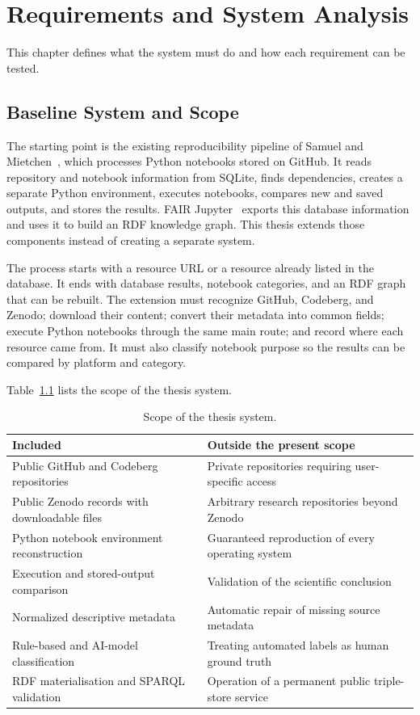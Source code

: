 \chapter{Requirements and System Analysis}
\label{chap:requirements}

This chapter defines what the system must do and how each requirement can be tested.

\section{Baseline System and Scope}

The starting point is the existing reproducibility pipeline of Samuel and Mietchen~\cite{samuel2024computational}, which processes Python notebooks stored on GitHub. It reads repository and notebook information from SQLite, finds dependencies, creates a separate Python environment, executes notebooks, compares new and saved outputs, and stores the results. FAIR Jupyter~\cite{samuel2024fairjupyter} exports this database information and uses it to build an RDF knowledge graph. This thesis extends those components instead of creating a separate system.

The process starts with a resource URL or a resource already listed in the database. It ends with database results, notebook categories, and an RDF graph that can be rebuilt. The extension must recognize GitHub, Codeberg, and Zenodo; download their content; convert their metadata into common fields; execute Python notebooks through the same main route; and record where each resource came from. It must also classify notebook purpose so the results can be compared by platform and category.

Table~\ref{tab:scope} lists the scope of the thesis system.

\begin{table}[H]
\centering
\caption{Scope of the thesis system.}
\label{tab:scope}
\footnotesize
\begin{tabularx}{\textwidth}{@{}XX@{}}
\toprule
Included & Outside the present scope\tabularnewline
\midrule
Public GitHub and Codeberg repositories & Private repositories requiring user-specific access\tabularnewline
Public Zenodo records with downloadable files & Arbitrary research repositories beyond Zenodo\tabularnewline
Python notebook environment reconstruction & Guaranteed reproduction of every operating system\tabularnewline
Execution and stored-output comparison & Validation of the scientific conclusion\tabularnewline
Normalized descriptive metadata & Automatic repair of missing source metadata\tabularnewline
Rule-based and AI-model classification & Treating automated labels as human ground truth\tabularnewline
RDF materialisation and SPARQL validation & Operation of a permanent public triple-store service\tabularnewline
\bottomrule
\end{tabularx}
\end{table}


